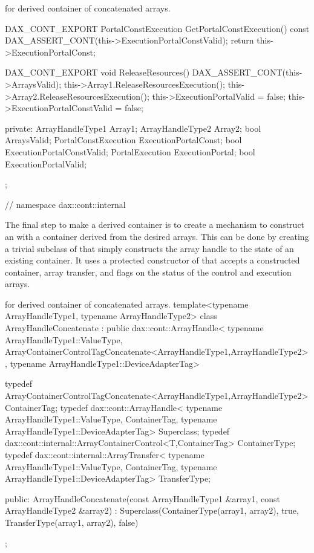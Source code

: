 \begin{daxexample}[ex:DerivedArrayTransfer]{ for derived container of concatenated arrays.}
{{{{  DAX_CONT_EXPORT
  PortalConstExecution GetPortalConstExecution() const {
    DAX_ASSERT_CONT(this->ExecutionPortalConstValid);
    return this->ExecutionPortalConst;
  }

  DAX_CONT_EXPORT
  void ReleaseResources() {
    DAX_ASSERT_CONT(this->ArraysValid);
    this->Array1.ReleaseResourcesExecution();
    this->Array2.ReleaseResourcesExecution();
    this->ExecutionPortalValid = false;
    this->ExecutionPortalConstValid = false;
  }

private:
  ArrayHandleType1 Array1;
  ArrayHandleType2 Array2;
  bool ArraysValid;
  PortalConstExecution ExecutionPortalConst;
  bool ExecutionPortalConstValid;
  PortalExecution ExecutionPortal;
  bool ExecutionPortalValid;
};

}
}
} // namespace dax::cont::internal
\end{daxexample}


The final step to make a derived container is to create a mechanism to
construct an  with a container derived from the
desired arrays. This can be done by creating a trivial subclass of
 that simply constructs the array handle to the state
of an existing container. It uses a protected constructor of
 that accepts a constructed container, array transfer,
and flags on the status of the control and execution arrays. 

\begin{daxexample}{ for derived container of concatenated arrays.}
template<typename ArrayHandleType1, typename ArrayHandleType2>
class ArrayHandleConcatenate
  : public dax::cont::ArrayHandle<
      typename ArrayHandleType1::ValueType,
      ArrayContainerControlTagConcatenate<ArrayHandleType1,ArrayHandleType2>,
      typename ArrayHandleType1::DeviceAdapterTag>
{
  typedef ArrayContainerControlTagConcatenate<ArrayHandleType1,ArrayHandleType2>
      ContainerTag;
  typedef dax::cont::ArrayHandle<
      typename ArrayHandleType1::ValueType,
      ContainerTag,
      typename ArrayHandleType1::DeviceAdapterTag> Superclass;
  typedef dax::cont::internal::ArrayContainerControl<T,ContainerTag> ContainerType;
  typedef dax::cont::internal::ArrayTransfer<
      typename ArrayHandleType1::ValueType,
      ContainerTag,
      typename ArrayHandleType1::DeviceAdapterTag> TransferType;

public:
  ArrayHandleConcatenate(const ArrayHandleType1 &array1, const ArrayHandleType2 &array2)
    : Superclass(ContainerType(array1, array2),
                 true,
                 TransferType(array1, array2),
                 false)
  {  }
};
\end{daxexample}

